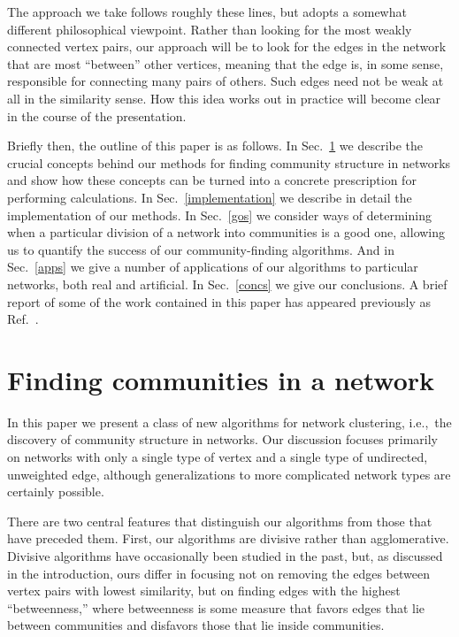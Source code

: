 \documentclass[twocolumn,pre,superscriptaddress]{revtex4}
\begin{document}
The approach we take follows roughly these lines, but adopts a somewhat
different philosophical viewpoint.  Rather than looking for the most weakly
connected vertex pairs, our approach will be to look for the edges in the
network that are most ``between'' other vertices, meaning that the edge is,
in some sense, responsible for connecting many pairs of others.  Such edges
need not be weak at all in the similarity sense.  How this idea works out
in practice will become clear in the course of the presentation.

Briefly then, the outline of this paper is as follows.  In
Sec.~\ref{algorithms} we describe the crucial concepts behind our methods
for finding community structure in networks and show how these concepts can
be turned into a concrete prescription for performing calculations.  In
Sec.~\ref{implementation} we describe in detail the implementation of our
methods.  In Sec.~\ref{gos} we consider ways of determining when a
particular division of a network into communities is a good one, allowing
us to quantify the success of our community-finding algorithms.  And in
Sec.~\ref{apps} we give a number of applications of our algorithms to
particular networks, both real and artificial.  In Sec.~\ref{concs} we give
our conclusions.  A brief report of some of the work contained in this
paper has appeared previously as Ref.~.


\section{Finding communities in a network}
\label{algorithms}
In this paper we present a class of new algorithms for network clustering,
i.e.,~the discovery of community structure in networks.  Our discussion
focuses primarily on networks with only a single type of vertex and a
single type of undirected, unweighted edge, although generalizations to
more complicated network types are certainly possible.

There are two central features that distinguish our algorithms from those
that have preceded them.  First, our algorithms are divisive rather than
agglomerative.  Divisive algorithms have occasionally been studied in the
past, but, as discussed in the introduction, ours differ in focusing not on
removing the edges between vertex pairs with lowest similarity, but on
finding edges with the highest ``betweenness,'' where betweenness is some
measure that favors edges that lie between communities and disfavors those
that lie inside communities.
\end{document}
